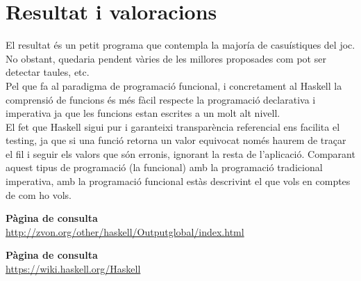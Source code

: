 \documentclass{article}
\begin{document}
\section{Resultat i valoracions}
El resultat és un petit programa que contempla la majoría de casuístiques del joc. No obstant, quedaria pendent vàries de les millores proposades com pot ser detectar taules, etc.\\[0.2cm]
Pel que fa al paradigma de programació funcional, i concretament al Haskell la comprensió de funcions és més fàcil respecte la programació declarativa i imperativa ja que les funcions estan escrites a un molt alt nivell.\\El fet que Haskell sigui pur i garanteixi transparència referencial ens facilita el testing, ja que si una funció retorna un valor equivocat només haurem de traçar el fil i seguir els valors que són erronis, ignorant la resta de l'aplicació. Comparant aquest tipus de programació (la funcional) amb la programació tradicional imperativa, amb la programació funcional estàs descrivint el que vols en comptes de com ho vols.
\begin{thebibliography}{9}
\textbf{Pàgina de consulta}\\
\url{http://zvon.org/other/haskell/Outputglobal/index.html}

\textbf{Pàgina de consulta}\\
\url{https://wiki.haskell.org/Haskell}

\end{thebibliography}
\end{document}
